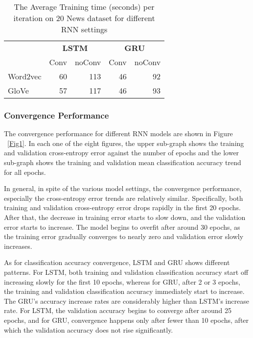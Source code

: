 \documentclass{article}
\begin{document}
\begin{table}
    \begin{tabular}{lrrrr}\toprule
        &\multicolumn{2}{c}{\textbf{LSTM}}&\multicolumn{2}{c}{\textbf{GRU}}
        \\\cmidrule(r){2-3}\cmidrule(r){4-5}
        &Conv&noConv&Conv&noConv\\\midrule
        Word2vec    & 60 & 113 & 46 & 92\\
        GloVe   & 57 & 117 & 46 & 93\\\bottomrule
    \end{tabular}
    \caption{\small The Average Training time (seconds) per iteration on 20 News dataset for different RNN settings}\label{Tab5}
\end{table}


\subsubsection*{Convergence Performance}
The convergence performance for different RNN models are shown in Figure ~\ref{Fig1}. In each one of the eight figures, the upper sub-graph shows the training and validation cross-entropy error against the number of epochs and the lower sub-graph shows the training and validation mean classification accuracy trend for all epochs.

In general, in spite of the various model settings, the convergence performance, especially the cross-entropy error trends are relatively similar. Specifically, both training and validation cross-entropy error drops rapidly in the first 20 epochs. After that, the decrease in training error starts to slow down, and the validation error starts to increase. The model begins to overfit after around 30 epochs, as the training error gradually converges to nearly zero and validation error slowly increases.

As for classification accuracy convergence, LSTM and GRU shows different patterns. For LSTM, both training and validation classification accuracy start off increasing slowly for the first 10 epochs, whereas for GRU, after 2 or 3 epochs, the training and validation classification accuracy immediately start to increase. The GRU’s accuracy increase rates are considerably higher than LSTM’s increase rate. For LSTM, the validation accuracy begins to converge after around 25 epochs, and for GRU, convergence happens only after fewer than 10 epochs, after which the validation accuracy does not rise significantly.
\end{document}
